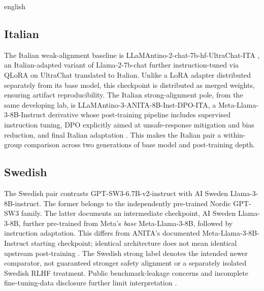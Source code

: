 \begin{otherlanguage*}{english}

\subsection{Italian}

The Italian weak-alignment baseline is LLaMAntino-2-chat-7b-hf-UltraChat-ITA \cite{basileLLaMAntino2023}, an Italian-adapted variant of Llama-2-7b-chat further instruction-tuned via QLoRA on UltraChat translated to Italian. Unlike a LoRA adapter distributed separately from its base model, this checkpoint is distributed as merged weights, ensuring artifact reproducibility. The Italian strong-alignment pole, from the same developing lab, is LLaMAntino-3-ANITA-8B-Inst-DPO-ITA, a Meta-Llama-3-8B-Instruct derivative whose post-training pipeline includes supervised instruction tuning, DPO explicitly aimed at unsafe-response mitigation and bias reduction, and final Italian adaptation \cite{polignanoLLaMAntino3ANITA2025, swapUnibaLLaMAntino3ANITA8BInstDPOITA2026}. This makes the Italian pair a within-group comparison across two generations of base model and post-training depth.

\subsection{Swedish}

The Swedish pair contrasts GPT-SW3-6.7B-v2-instruct with AI Sweden Llama-3-8B-instruct. The former belongs to the independently pre-trained Nordic GPT-SW3 family. The latter documents an intermediate checkpoint, AI Sweden Llama-3-8B, further pre-trained from Meta's \emph{base} Meta-Llama-3-8B, followed by instruction adaptation. This differs from ANITA's documented Meta-Llama-3-8B-Instruct starting checkpoint; identical architecture does not mean identical upstream post-training \cite{ekgren-etal-2024-gpt,AISwedenModelsLlama38B2024,aisweden_llama3_2024,swapUnibaLLaMAntino3ANITA8BInstDPOITA2026}. The Swedish strong label denotes the intended newer comparator, not guaranteed stronger safety alignment or a separately isolated Swedish RLHF treatment. Public benchmark-leakage concerns and incomplete fine-tuning-data disclosure further limit interpretation \cite{AISwedenModelsLlama38BInstructDiscussion62025}.


\end{otherlanguage*}
